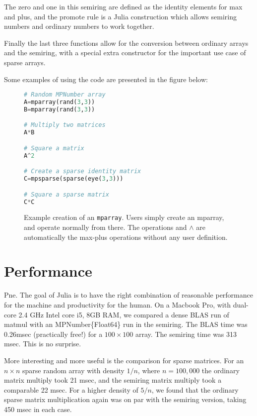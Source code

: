 \documentclass[conference]{IEEEtran}
\begin{document}
The zero and one in this semiring are defined as the identity elements for max and plus,
and the promote rule is a Julia construction which allows semiring numbers and ordinary
numbers to work together.

Finally the last three functions allow for the conversion between ordinary arrays and the semiring, with a special extra constructor for the important use case of sparse arrays.

Some examples of using the code are presented in the figure below:

\begin{figure}[h]
\begin{lstlisting}[language=python, frame=single]
# Random MPNumber array
A=mparray(rand(3,3)) 
B=mparray(rand(3,3))

# Multiply two matrices
A*B

# Square a matrix
A^2

# Create a sparse identity matrix
C=mpsparse(sparse(eye(3,3)))

# Square a sparse matrix
C*C
\end{lstlisting}
\label{fig:example}
\caption{Example creation of an {\tt mparray}.
Users simply create an mparray, and operate normally from there.
The operations {\tt *} and $\wedge$  are automatically the max-plus operations without any user definition.}
\end{figure}

\section{Performance}

Pne.
The goal of Julia is to have the right combination of reasonable performance
for the machine and productivity for the human.  
On a Macbook Pro, with dual-core 2.4 GHz Intel core i5, 8GB RAM, we compared a dense BLAS run of matmul with an MPNumber\{Float64\} run in the semiring.
The BLAS time was 0.26msec (practically free!) for a $100 \times 100$ array.  The semiring time
was 313 msec.  This is no surprise.

More interesting and more useful is the comparison for sparse
matrices.  For an $n \times n$ sparse random array with density $1/n$,
where $n = 100,000$ the ordinary matrix multiply took 21 msec, and the
semiring matrix multiply took a comparable 22 msec. For a higher
density of $5/n$, we found that the ordinary sparse matrix
multiplication again was on par with the semiring version, taking 450
msec in each case.
\end{document}
